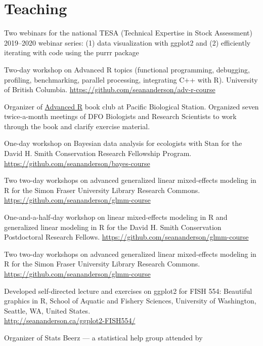 \hypertarget{teaching}{%
\section{Teaching}\label{teaching}}

\begin{description}
\tightlist
\item[2020]
Two webinars for the national TESA (Technical Expertise in Stock
Assessment) 2019--2020 webinar series: (1) data visualization with
ggplot2 and (2) efficiently iterating with code using the purrr package
\item[2019]
Two-day workshop on Advanced R topics (functional programming,
debugging, profiling, benchmarking, parallel processing, integrating C++
with R). University of British Columbia.
\url{https://github.com/seananderson/adv-r-course}
\item[2019]
Organizer of \href{https://adv-r.hadley.nz/}{Advanced R} book club at
Pacific Biological Station. Organized seven twice-a-month meetings of
DFO Biologists and Research Scientists to work through the book and
clarify exercise material.
\item[2018]
One-day workshop on Bayesian data analysis for ecologists with Stan for
the David H. Smith Conservation Research Fellowship Program.
\url{https://github.com/seananderson/bayes-course}
\item[2018]
Two two-day workshops on advanced generalized linear mixed-effects
modeling in R for the Simon Fraser University Library Research Commons.
\url{https://github.com/seananderson/glmm-course}
\item[2017]
One-and-a-half-day workshop on linear mixed-effects modeling in R and
generalized linear modeling in R for the David H. Smith Conservation
Postdoctoral Research Fellows.
\url{https://github.com/seananderson/glmm-course}
\item[2016]
Two two-day workshops on advanced generalized linear mixed-effects
modeling in R for the Simon Fraser University Library Research Commons.
\url{https://github.com/seananderson/glmm-course}
\item[2014--16]
Developed self-directed lecture and exercises on ggplot2 for FISH 554:
Beautiful graphics in R, School of Aquatic and Fishery Sciences,
University of Washington, Seattle, WA, United States.\\
\url{http://seananderson.ca/ggplot2-FISH554/}
\item[2013--14]
Organizer of Stats Beerz --- a statistical help group attended by

\end{description}
